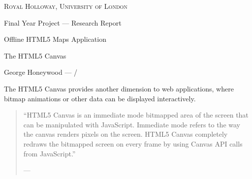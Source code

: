 


{
\centering
{\scshape\large Royal Holloway, University of London\par}
\vspace{0.5cm}
{\Huge Final Year Project --- Research Report\par}
\vspace{0.2cm}
{\Large Offline HTML5 Maps Application\par}
\vspace{0.2cm}
{\Huge The HTML5 Canvas\par}
\vspace{0.5cm}
{\large George Honeywood --- \the\month/\the\year\par}
\vspace{0.5cm}
}

The HTML5 Canvas provides another dimension to web applications, where bitmap animations or other data can be displayed interactively.

\begin{quote}
    ``HTML5 Canvas is an immediate mode bitmapped area of the screen that can be manipulated with JavaScript. Immediate mode refers to the way the canvas renders pixels on the screen. HTML5 Canvas completely redraws the bitmapped screen on every frame by using Canvas API calls from JavaScript.''

    \footnotesize{--- }
\end{quote}

\printbibliography{}


